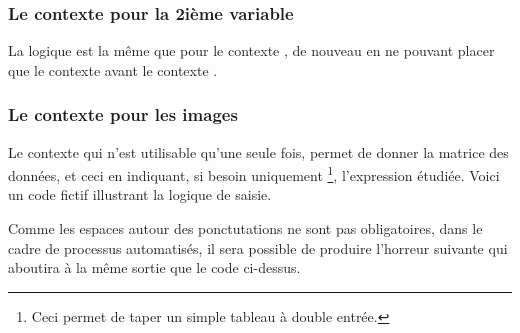
\subsubsection{Le contexte  pour la 2ième variable}

La logique est la même que pour le contexte , de nouveau en ne pouvant placer que le contexte  avant le contexte .



\subsubsection{Le contexte  pour les images}

Le contexte  qui n'est utilisable qu'une seule fois, permet de donner la matrice des données, et ceci en indiquant, si besoin uniquement
\footnote{
	Ceci permet de taper un simple tableau à double entrée.
},
l'expression étudiée.
Voici un code fictif illustrant la logique de saisie.




Comme les espaces autour des ponctutations ne sont pas obligatoires, dans le cadre de processus automatisés, il sera possible de produire l'horreur suivante qui aboutira à la même sortie que le code ci-dessus.

